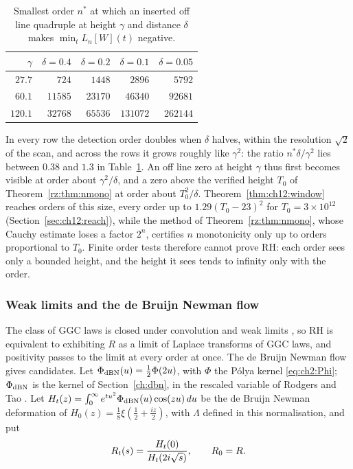 \begin{table}[htbp]
\centering
\small
\begin{tabular}{rrrrr}
\toprule
$\gamma$ & $\delta=0.4$ & $\delta=0.2$ & $\delta=0.1$ & $\delta=0.05$\\
\midrule
$27.7$ & $724$ & $1448$ & $2896$ & $5792$\\
$60.1$ & $11585$ & $23170$ & $46340$ & $92681$\\
$120.1$ & $32768$ & $65536$ & $131072$ & $262144$\\
\bottomrule
\end{tabular}
\caption{Smallest order $n^*$ at which an inserted off line quadruple at height $\gamma$ and distance $\delta$ makes $\min_t L_n[W](t)$ negative.}
\label{rz:tab:resolution}
\end{table}

In every row the detection order doubles when $\delta$ halves, within the resolution $\sqrt2$ of the scan, and across the rows it grows roughly like $\gamma^2$: the ratio $n^*\delta/\gamma^2$ lies between $0.38$ and $1.3$ in Table~\ref{rz:tab:resolution}. An off line zero at height $\gamma$ thus first becomes visible at order about $\gamma^2/\delta$, and a zero above the verified height $T_0$ of Theorem~\ref{rz:thm:nmono} at order about $T_0^2/\delta$. Theorem~\ref{thm:ch12:window} reaches orders of this size, every order up to $1.29(T_0-23)^2$ for $T_0=3\times10^{12}$ (Section~\ref{sec:ch12:reach}), while the method of Theorem~\ref{rz:thm:nmono}, whose Cauchy estimate loses a factor $2^n$, certifies $n$ monotonicity only up to orders proportional to $T_0$. Finite order tests therefore cannot prove RH: each order sees only a bounded height, and the height it sees tends to infinity only with the order.

\subsubsection{Weak limits and the de Bruijn Newman flow}

The class of GGC laws is closed under convolution and weak limits \cite[Section 3.1]{Bondesson}, so RH is equivalent to exhibiting $R$ as a limit of Laplace transforms of GGC laws, and positivity passes to the limit at every order at once. The de Bruijn Newman flow gives candidates. Let $\Phi_{\rm dBN}(u)=\frac12\Phi(2u)$, with $\Phi$ the P\'olya kernel \eqref{eq:ch2:Phi}; $\Phi_{\rm dBN}$ is the kernel of Section~\ref{ch:dbn}, in the rescaled variable of Rodgers and Tao \cite{RodgersTao}. Let $H_t(z)=\int_0^\infty e^{tu^2}\Phi_{\rm dBN}(u)\cos(zu)\,du$ be the de Bruijn Newman deformation of $H_0(z)=\frac18\xi(\frac12+\frac{iz}2)$, with $\Lambda$ defined in this normalisation, and put
\[
R_t(s)=\frac{H_t(0)}{H_t(2i\sqrt{s})},\qquad R_0=R .
\]

